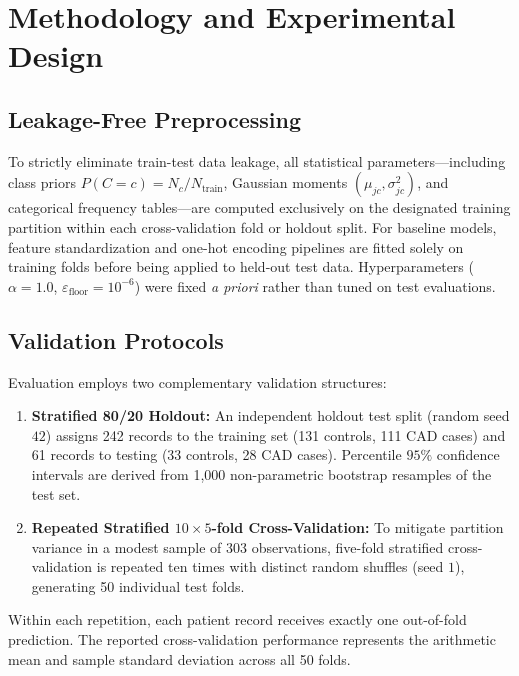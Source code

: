 \documentclass[conference]{IEEEtran}
\begin{document}
\section{Methodology and Experimental Design}

\subsection{Leakage-Free Preprocessing}
To strictly eliminate train-test data leakage, all statistical parameters---including class priors $P(C=c)=N_c/N_{\mathrm{train}}$, Gaussian moments $(\mu_{jc},\sigma_{jc}^{2})$, and categorical frequency tables---are computed exclusively on the designated training partition within each cross-validation fold or holdout split. For baseline models, feature standardization and one-hot encoding pipelines are fitted solely on training folds before being applied to held-out test data. Hyperparameters ($\alpha=1.0$, $\varepsilon_{\mathrm{floor}}=10^{-6}$) were fixed \textit{a priori} rather than tuned on test evaluations.

\subsection{Validation Protocols}
Evaluation employs two complementary validation structures:
\begin{enumerate}
\item \textbf{Stratified 80/20 Holdout:} An independent holdout test split (random seed $42$) assigns 242 records to the training set (131 controls, 111 CAD cases) and 61 records to testing (33 controls, 28 CAD cases). Percentile $95\%$ confidence intervals are derived from 1{,}000 non-parametric bootstrap resamples of the test set.
\item \textbf{Repeated Stratified $10 \times 5$-fold Cross-Validation:} To mitigate partition variance in a modest sample of 303 observations, five-fold stratified cross-validation is repeated ten times with distinct random shuffles (seed $1$), generating 50 individual test folds.
\end{enumerate}
Within each repetition, each patient record receives exactly one out-of-fold prediction. The reported cross-validation performance represents the arithmetic mean and sample standard deviation across all 50 folds.
\end{document}
